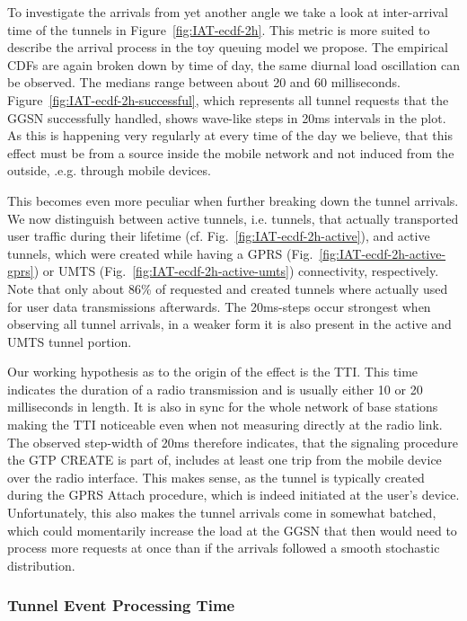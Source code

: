 To investigate the arrivals from yet another angle we take a look at inter-arrival time of the tunnels in Figure~\ref{fig:IAT-ecdf-2h}. This metric is more suited to describe the arrival process in the toy queuing model we propose. The empirical CDFs are again broken down by time of day, the same diurnal load oscillation can be observed. The medians range between about 20 and 60 milliseconds. Figure~\ref{fig:IAT-ecdf-2h-successful}, which represents all tunnel requests that the \ac{GGSN} successfully handled, shows wave-like steps in 20ms intervals in the plot. As this is happening very regularly at every time of the day we believe, that this effect must be from a source inside the mobile network and not induced from the outside, .e.g. through mobile devices.

This becomes even more peculiar when further breaking down the tunnel arrivals. We now distinguish between active tunnels, i.e. tunnels, that actually transported user traffic during their lifetime (cf. Fig.~\ref{fig:IAT-ecdf-2h-active}), and active tunnels, which were created while having a GPRS (Fig.~\ref{fig:IAT-ecdf-2h-active-gprs}) or UMTS (Fig.~\ref{fig:IAT-ecdf-2h-active-umts}) connectivity, respectively. Note that only about 86\% of requested and created tunnels where actually used for user data transmissions afterwards. The 20ms-steps occur strongest when observing all tunnel arrivals, in a weaker form it is also present in the active and \ac{UMTS} tunnel portion. 

Our working hypothesis as to the origin of the effect is the \ac{TTI}. This time indicates the duration of a radio transmission and is usually either 10 or 20 milliseconds in length. It is also in sync for the whole network of base stations making the \ac{TTI} noticeable even when not measuring directly at the radio link. The observed step-width of 20ms therefore indicates, that the signaling procedure the GTP CREATE is part of, includes at least one trip from the mobile device over the radio interface. This makes sense, as the tunnel is typically created during the GPRS Attach procedure, which is indeed initiated at the user's device. Unfortunately, this also makes the tunnel arrivals come in somewhat batched, which could momentarily increase the load at the \ac{GGSN} that then would need to process more requests at once than if the arrivals followed a smooth stochastic distribution.




\subsubsection{Tunnel Event Processing Time}

